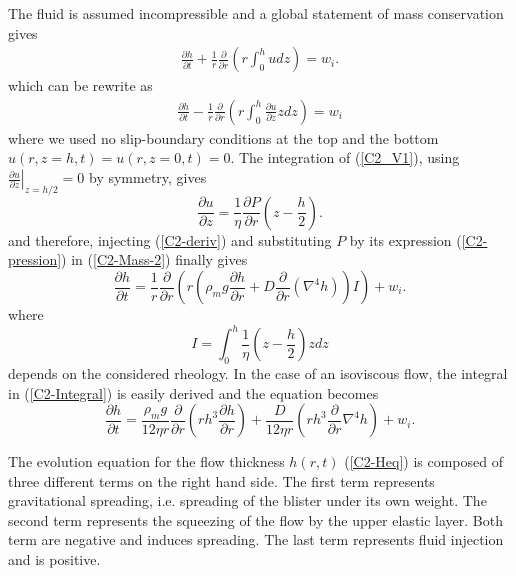 The fluid  is assumed  incompressible and a  global statement  of mass
conservation gives
\begin{eqnarray}
  \frac{\partial         h}{\partial        t} +\frac{1}{r}
  \frac{\partial}{\partial
  r} \left( r\int_0^hudz\right) = w_i.
  \label{C2-Mass}
\end{eqnarray}
which can be rewrite as
\begin{eqnarray}
  \frac{\partial         h}{\partial        t} -\frac{1}{r}
  \frac{\partial}{\partial
  r} \left( r\int_0^h\frac{\partial u}{\partial z}zdz\right) = w_i
  \label{C2-Mass-2}
\end{eqnarray}
where we  used no slip-boundary conditions  at the top and  the bottom
$u(r,z=h,t)=u(r,z=0,t)=0$.   The integration  of (\ref{C2_V1}),  using
$\left.\frac{\partial  u}{\partial  z}\right|_{z=h/2}=0$ by  symmetry,
gives
\begin{equation}
  \frac{\partial     u}{\partial    z}=     \frac{1}{\eta}\frac{\partial
    P}{\partial r} \left(z-\frac{h}{2}\right).
  \label{C2-deriv}
\end{equation}
and therefore, injecting (\ref{C2-deriv})  and substituting $P$ by its
expression (\ref{C2-pression}) in (\ref{C2-Mass-2}) finally gives
\begin{equation}
  \frac{\partial h}{\partial t} = \frac{1}{r}
  \frac{\partial}{\partial r} \left( r\left(\rho_m g \frac{\partial h}{\partial      r}+D\frac{\partial}{\partial      r}\left(\nabla^4h\right)\right)I\right)
  + w_i.
  \label{C2-EqConservation}
\end{equation}
where
\begin{equation}
  I = \int_0^h\frac{1}{\eta}\left(z-\frac{h}{2}\right)z dz
  \label{C2-Integral}
\end{equation}
depends on the considered rheology. In the case of an isoviscous flow,
the integral in (\ref{C2-Integral}) is easily derived and the equation
becomes
\begin{equation}
  \frac{\partial h}{\partial t} =\frac{\rho_mg}{12 \eta r}
  \frac{\partial}{\partial r}  \left( rh^3  \frac{\partial h}{\partial
      r}\right)+\frac{D}{12\eta r} \left( rh^3 \frac{\partial}{\partial r}\nabla^4h\right)+
  w_i .\label{C2-Heq}
\end{equation}

The evolution equation for  the flow thickness $h(r,t)$ (\ref{C2-Heq})
is composed of three different terms on the right hand side. The first
term  represents  gravitational  spreading,  i.e.   spreading  of  the
blister under its own weight. The second term represents the squeezing
of the  flow by the upper  elastic layer.  Both term  are negative and
induces spreading.   The last term  represents fluid injection  and is
positive.

